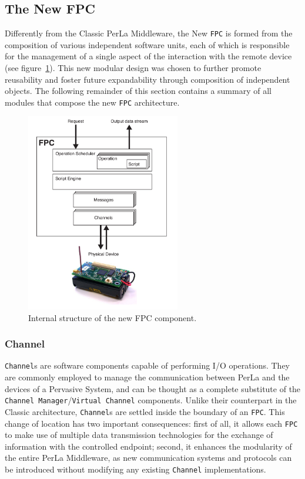 \subsection{The New FPC}

Differently from the Classic PerLa Middleware, the New \texttt{FPC} is formed
from the composition of various independent software units, each of which is
responsible for the management of a single aspect of the interaction with the
remote device (see figure~\ref{fig:fpc_overview}). This new modular design was
chosen to further promote reusability and foster future expandability through
composition of independent objects. The following remainder of this section
contains a summary of all modules that compose the new \texttt{FPC}
architecture.

\begin{figure}[h!]
\center
\includegraphics[width=0.6\textwidth]{imgs/fpc.pdf}
\caption{Internal structure of the new FPC component.}
\label{fig:fpc_overview}
\end{figure}

\subsubsection{Channel}

\texttt{Channel}s are software components capable of performing I/O operations.
They are commonly employed to manage the communication between PerLa and the
devices of a Pervasive System, and can be thought as a complete substitute of
the \texttt{Channel Manager}/\texttt{Virtual Channel} components. Unlike their
counterpart in the Classic architecture, \texttt{Channel}s are settled inside
the boundary of an \texttt{FPC}. This change of location has two important
consequences: first of all, it allows each \texttt{FPC} to make use of multiple
data transmission technologies for the exchange of information with the
controlled endpoint; second, it enhances the modularity of the entire PerLa
Middleware, as new communication systems and protocols can be introduced
without modifying any existing \texttt{Channel} implementations.

